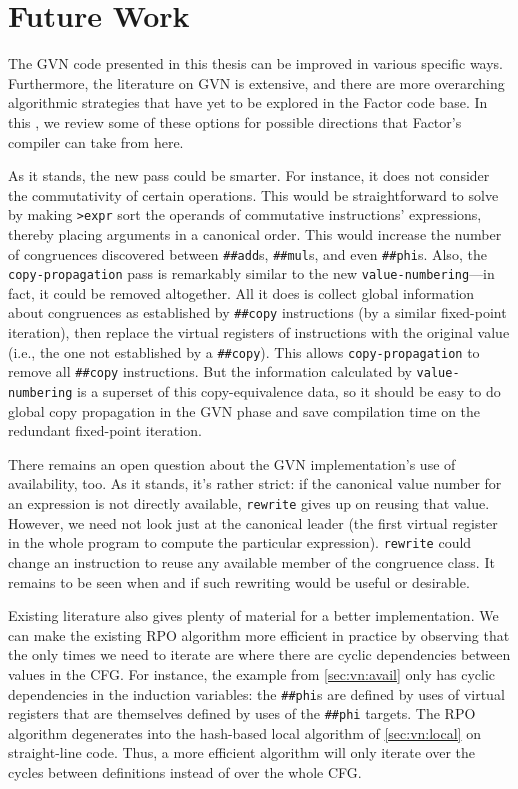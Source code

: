 \section{Future Work}\label{sec:vn:future}

The \gls{GVN} code presented in this thesis can be improved in various specific
ways.  Furthermore, the literature on \gls{GVN} is extensive, and there are
more overarching algorithmic strategies that have yet to be explored in the
Factor code base.  In this , we review some of these
options for possible directions that Factor's compiler can take from here.

As it stands, the new pass could be smarter.  For instance, it does not
consider the commutativity of certain operations.  This would be
straightforward to solve by making \Verb|>expr| sort the operands of
commutative instructions' expressions, thereby placing arguments in a canonical
order.  This would increase the number of congruences discovered between
\Verb|##add|s, \Verb|##mul|s, and even \Verb|##phi|s.  Also, the
\Verb|copy-propagation| pass is remarkably similar to the new
\Verb|value-numbering|---in fact, it could be removed altogether.  All it does
is collect global information about congruences as established by \Verb|##copy|
instructions (by a similar fixed-point iteration), then replace the virtual
registers of instructions with the original value (i.e., the one not
established by a \Verb|##copy|).  This allows \Verb|copy-propagation| to remove
all \Verb|##copy| instructions.  But the information calculated by
\Verb|value-numbering| is a superset of this copy-equivalence data, so it
should be easy to do global copy propagation in the \gls{GVN} phase and save
compilation time on the redundant fixed-point iteration.

There remains an open question about the \gls{GVN} implementation's use of
availability, too.  As it stands, it's rather strict: if the canonical value
number for an expression is not directly available, \Verb|rewrite| gives up on
reusing that value.  However, we need not look just at the canonical leader
(the first virtual register in the whole program to compute the particular
expression).  \Verb|rewrite| could change an instruction to reuse any available
member of the congruence class.  It remains to be seen when and if such
rewriting would be useful or desirable.

Existing literature also gives plenty of material for a better implementation.
We can make the existing \gls{RPO} algorithm more efficient in practice by
observing that the only times we need to iterate are where there are cyclic
dependencies between values in the \gls{CFG}.  For instance, the example from
\cref{sec:vn:avail} only has cyclic dependencies in the induction variables:
the \Verb|##phi|s are defined by uses of virtual registers that are themselves
defined by uses of the \Verb|##phi| targets.  The \gls{RPO} algorithm
degenerates into the hash-based local algorithm of \cref{sec:vn:local} on
straight-line code.  Thus, a more efficient algorithm will only iterate over
the cycles between definitions instead of over the whole \gls{CFG}.  

